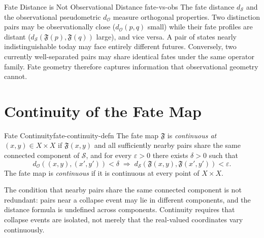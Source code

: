 \documentclass[12pt,twoside,openright]{book}
\newcommand{\distPairs}{X\times X}
\newcommand{\fateMap}{\mathfrak{F}}
\newcommand{\fateSpace}{\mathcal{S}}
\newcommand{\distMetric}{d_{\mathcal{O}}}
\newcommand{\fateDist}[2]{d_{\fateSpace}(#1,#2)}
\newcommand{\distDist}[2]{d_{\mathcal{O}}(#1,#2)}
\providecommand{\fateDist}[2]{d_{\fateSpace}(#1,#2)}
\providecommand{\distDist}[2]{d_{\mathcal{O}}(#1,#2)}
\begin{document}
\begin{remark}{Fate Distance is Not Observational Distance}%
  {fate-vs-obs}
The fate distance $d_{\fateSpace}$ and the observational
pseudometric $\distMetric$ measure orthogonal properties.
Two distinction pairs may be observationally close
($\distDist{p}{q}$ small) while their fate profiles are distant
($\fateDist{\fateMap(p)}{\fateMap(q)}$ large), and vice versa.
A pair of states nearly indistinguishable today may face
entirely different futures. Conversely, two currently well-separated
pairs may share identical fates under the same operator family.
Fate geometry therefore captures information that observational
geometry cannot.
\end{remark}

\section{Continuity of the Fate Map}

\begin{definition}{Fate Continuity}{fate-continuity-defn}
The fate map $\fateMap$ is \emph{continuous at} $(x,y)\in\distPairs$
if $\fateMap(x,y)$ and all sufficiently nearby pairs share the
same connected component of $\fateSpace$, and for every
$\varepsilon>0$ there exists $\delta>0$ such that
\[
  \distDist{(x,y)}{(x',y')} < \delta
  \;\Longrightarrow\;
  \fateDist{\fateMap(x,y)}{\fateMap(x',y')} < \varepsilon.
\]
The fate map is \emph{continuous} if it is continuous at every
point of $\distPairs$.
\end{definition}

The condition that nearby pairs share the same connected component
is not redundant: pairs near a collapse event may lie in different
components, and the distance formula is undefined across components.
Continuity requires that collapse events are isolated, not merely
that the real-valued coordinates vary continuously.
\end{document}
